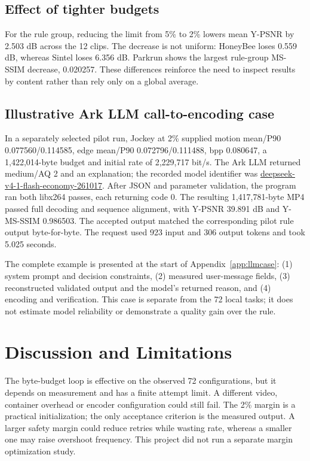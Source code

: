 \documentclass[conference]{IEEEtran}
\begin{document}
\subsection{Effect of tighter budgets}
For the rule group, reducing the limit from 5\% to 2\% lowers mean Y-PSNR by 2.503 dB across the 12 clips. The decrease is not uniform: HoneyBee loses 0.559 dB, whereas Sintel loses 6.356 dB. Parkrun shows the largest rule-group MS-SSIM decrease, 0.020257. These differences reinforce the need to inspect results by content rather than rely only on a global average.

\subsection{Illustrative Ark LLM call-to-encoding case}
In a separately selected pilot run, Jockey at 2\% supplied motion mean/P90 0.077560/0.114585, edge mean/P90 0.072796/0.111488, bpp 0.080647, a 1,422,014-byte budget and initial rate of 2,229,717 bit/s. The Ark LLM returned medium/AQ 2 and an explanation; the recorded model identifier was \url{deepseek-v4-1-flash-economy-261017}. After JSON and parameter validation, the program ran both libx264 passes, each returning code 0. The resulting 1,417,781-byte MP4 passed full decoding and sequence alignment, with Y-PSNR 39.891 dB and Y-MS-SSIM 0.986503. The accepted output matched the corresponding pilot rule output byte-for-byte. The request used 923 input and 306 output tokens and took 5.025 seconds.

The complete example is presented at the start of Appendix~\ref{app:llmcase}: (1) system prompt and decision constraints, (2) measured user-message fields, (3) reconstructed validated output and the model's returned reason, and (4) encoding and verification. This case is separate from the 72 local tasks; it does not estimate model reliability or demonstrate a quality gain over the rule.
\section{Discussion and Limitations}
The byte-budget loop is effective on the observed 72 configurations, but it depends on measurement and has a finite attempt limit. A different video, container overhead or encoder configuration could still fail. The 2\% margin is a practical initialization; the only acceptance criterion is the measured output. A larger safety margin could reduce retries while wasting rate, whereas a smaller one may raise overshoot frequency. This project did not run a separate margin optimization study.
\end{document}
